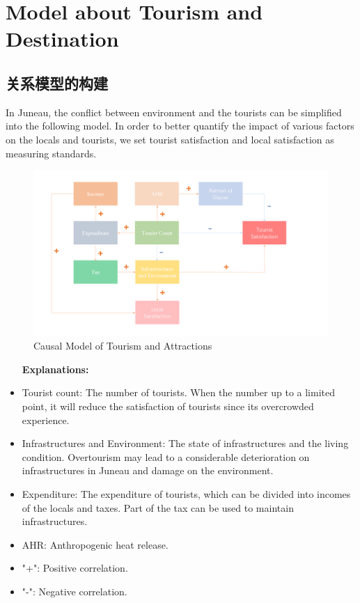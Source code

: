\documentclass[12pt]{article}  %
\begin{document}
 
 
 \section{Model about Tourism and Destination}
 \subsection{关系模型的构建}
 In Juneau, the conflict between environment and the tourists can be simplified into the following model. In order to better quantify the impact of various factors on the locals and tourists, we set tourist satisfaction and local satisfaction as measuring standards.
 
 \begin{figure}[htbp]  %
 
    \centering  %
    \includegraphics[width=1.2\textwidth]{chart1.png} %
    \caption{Causal Model of Tourism and Attractions} %
    \label{fig1}%
    \end{figure}
 

 \begin{itemize}
     \setlength{\parsep}{0ex} %
     \setlength{\topsep}{2ex} %
     \setlength{\itemsep}{1ex} %
 \item [\textbf{Explanations:}] 
        \item Tourist count: The number of tourists. When the number up to a limited point, it will reduce the satisfaction of tourists since its overcrowded experience.
        \item Infrastructures and Environment: The state of infrastructures and the living condition. Overtourism may lead to a considerable deterioration on infrastructures in Juneau and damage on the environment.
        \item Expenditure: The expenditure of tourists, which can be divided into incomes of the locals and taxes. Part of the tax can be used to maintain infrastructures.
        \item AHR: Anthropogenic heat release.
        \item "+": Positive correlation.
        \item "-": Negative correlation.\\
 \end{itemize}
\end{document}
